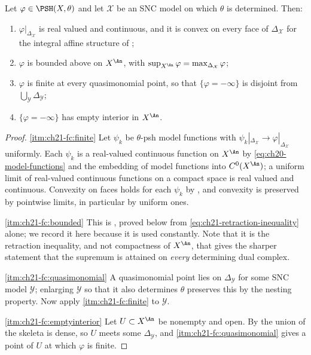 \begin{proposition}
\label{prop:ch21-first-consequences}
Let $\varphi\in\PSH(X,\theta)$ and let $\mathcal X$ be an SNC model on
which $\theta$ is determined.  Then:
\begin{enumerate}
\item\label{itm:ch21-fc:finite}
$\varphi|_{\Delta_{\mathcal X}}$ is real valued and continuous, and it is
convex on every face of $\Delta_{\mathcal X}$ for the integral affine
structure of ;
\item\label{itm:ch21-fc:bounded}
$\varphi$ is bounded above on $X^{\An}$, with
$\sup_{X^{\An}}\varphi=\max_{\Delta_{\mathcal X}}\varphi$;
\item\label{itm:ch21-fc:quasimonomial}
$\varphi$ is finite at every quasimonomial point, so that
$\{\varphi=-\infty\}$ is disjoint from
$\bigcup_{\mathcal Y}\Delta_{\mathcal Y}$;
\item\label{itm:ch21-fc:emptyinterior}
$\{\varphi=-\infty\}$ has empty interior in $X^{\An}$.
\end{enumerate}
\end{proposition}

\begin{proof}
\cref{itm:ch21-fc:finite}  Let $\psi_k$ be $\theta$-psh model functions
with $\psi_k|_{\Delta_{\mathcal X}}\to\varphi|_{\Delta_{\mathcal X}}$
uniformly.  Each $\psi_k$ is a real-valued continuous function on
$X^{\An}$ by \eqref{eq:ch20-model-functions} and the embedding of model
functions into $C^0(X^{\An})$; a uniform limit of real-valued continuous
functions on a compact space is real valued and continuous.  Convexity on
faces holds for each $\psi_k$ by
, and convexity is preserved by
pointwise limits, in particular by uniform ones.

\cref{itm:ch21-fc:bounded}  This is , proved
below from \eqref{eq:ch21-retraction-inequality} alone; we record it here
because it is used constantly.  Note that it is the retraction inequality,
and not compactness of $X^{\An}$, that gives the sharper statement that
the supremum is attained on \emph{every} determining dual complex.

\cref{itm:ch21-fc:quasimonomial}  A quasimonomial point lies on
$\Delta_{\mathcal Y}$ for some SNC model $\mathcal Y$; enlarging
$\mathcal Y$ so that it also determines $\theta$ preserves this by the
nesting property.  Now apply \cref{itm:ch21-fc:finite} to $\mathcal Y$.

\cref{itm:ch21-fc:emptyinterior}  Let $U\subset X^{\An}$ be nonempty and
open.  By  the union of the skeleta is
dense, so $U$ meets some $\Delta_{\mathcal Y}$, and
\cref{itm:ch21-fc:quasimonomial} gives a point of $U$ at which $\varphi$
is finite.
\end{proof}

